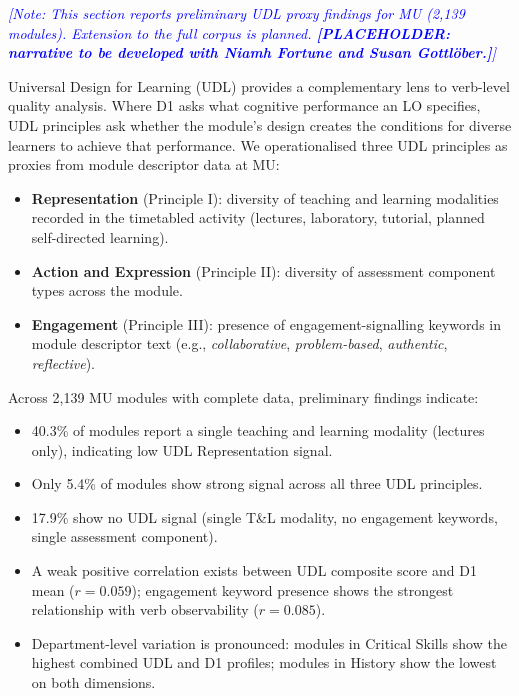 \documentclass[12pt, a4paper]{article}
\newcommand{\note}[1]{\textcolor{blue}{\textit{[Note: #1]}}}
\begin{document}
\note{This section reports preliminary UDL proxy findings for MU (2,139 modules).
Extension to the full corpus is planned. \textbf{[PLACEHOLDER: narrative to be
developed with Niamh Fortune and Susan Gottl{\"o}ber.]}}

Universal Design for Learning (UDL) \citep{cast2018udl} provides a complementary
lens to verb-level quality analysis. Where D1 asks what cognitive performance an LO
specifies, UDL principles ask whether the module's design creates the conditions for
diverse learners to achieve that performance. We operationalised three UDL principles
as proxies from module descriptor data at MU:

\begin{itemize}
  \item \textbf{Representation} (Principle I): diversity of teaching and learning
    modalities recorded in the timetabled activity (lectures, laboratory, tutorial,
    planned self-directed learning).
  \item \textbf{Action and Expression} (Principle II): diversity of assessment
    component types across the module.
  \item \textbf{Engagement} (Principle III): presence of engagement-signalling
    keywords in module descriptor text (e.g., \textit{collaborative},
    \textit{problem-based}, \textit{authentic}, \textit{reflective}).
\end{itemize}

Across 2,139 MU modules with complete data, preliminary findings indicate:

\begin{itemize}
  \item 40.3\% of modules report a single teaching and learning modality (lectures
    only), indicating low UDL Representation signal.
  \item Only 5.4\% of modules show strong signal across all three UDL principles.
  \item 17.9\% show no UDL signal (single T\&L modality, no engagement keywords,
    single assessment component).
  \item A weak positive correlation exists between UDL composite score and D1 mean
    ($r = 0.059$); engagement keyword presence shows the strongest relationship
    with verb observability ($r = 0.085$).
  \item Department-level variation is pronounced: modules in Critical Skills show the
    highest combined UDL and D1 profiles; modules in History show the lowest on
    both dimensions.
\end{itemize}
\end{document}
